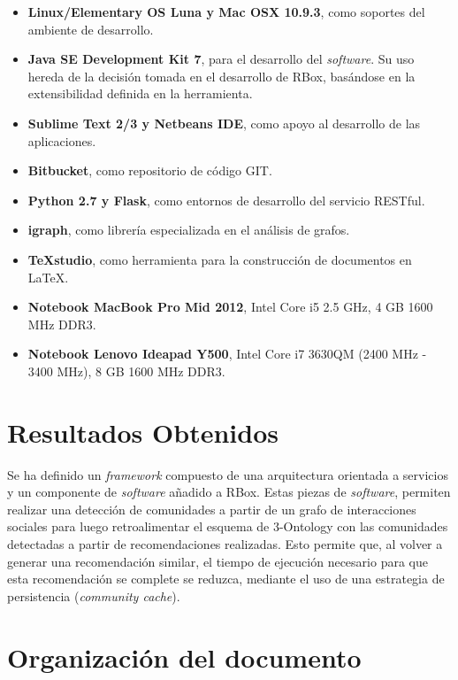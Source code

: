 \begin{itemize}
  \item \textbf{Linux/Elementary OS Luna y Mac OSX 10.9.3}, como soportes del ambiente de desarrollo.
  \item \textbf{Java SE Development Kit 7}, para el desarrollo del \textit{software}. Su uso hereda de la decisión tomada en el desarrollo de RBox, basándose en la extensibilidad definida en la herramienta.
  \item \textbf{Sublime Text 2/3 y Netbeans IDE}, como apoyo al desarrollo de las aplicaciones.
  \item \textbf{Bitbucket}, como repositorio de código GIT.
  \item \textbf{Python 2.7 y Flask}, como entornos de desarrollo del servicio RESTful.
  \item \textbf{igraph}, como librería especializada en el análisis de grafos.
  \item \textbf{TeXstudio}, como herramienta para la construcción de documentos en LaTeX.
  \item \textbf{Notebook MacBook Pro Mid 2012}, Intel Core i5 2.5 GHz, 4 GB 1600 MHz DDR3.
  \item \textbf{Notebook Lenovo Ideapad Y500}, Intel Core i7 3630QM (2400 MHz - 3400 MHz), 8 GB 1600 MHz DDR3.
\end{itemize}

\section{Resultados Obtenidos}
\label{intro:resultados}

Se ha definido un \textit{framework} compuesto de una arquitectura orientada a servicios y un componente de \textit{software} añadido a RBox. Estas piezas de \textit{software}, permiten realizar una detección de comunidades a partir de un grafo de interacciones sociales para luego retroalimentar el esquema de 3-Ontology con las comunidades detectadas a partir de recomendaciones realizadas. Esto permite que, al volver a generar una recomendación similar, el tiempo de ejecución necesario para que esta recomendación se complete se reduzca, mediante el uso de una estrategia de persistencia (\textit{community cache}).

\section{Organizaci\'on del documento}
\label{intro:organizacion}

